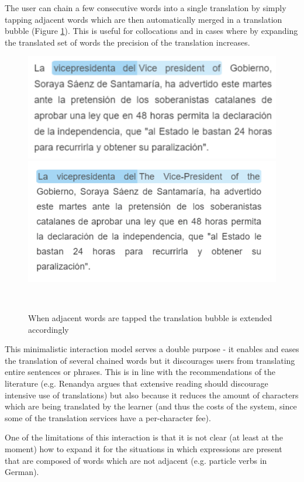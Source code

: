 The user can chain a few consecutive words into a single translation by simply tapping adjacent words which are then automatically merged in a translation bubble (Figure \ref{fig:translation_extension}). This is useful for collocations and in cases where by expanding the translated set of words the precision of the translation increases. 

    \begin{figure}[h!]
    \centering
      \includegraphics[width=0.75\columnwidth]{figures/translated_words1}
      \includegraphics[width=0.75\columnwidth]{figures/translated_words2}
      \caption{When adjacent words are tapped the translation bubble is extended accordingly}~\label{fig:translation_extension}
    \end{figure}

This minimalistic interaction model serves a double purpose - it enables and eases the translation of several chained words but it discourages users from translating entire sentences or phrases. This is in line with the recommendations of the literature (e.g. Renandya argues that extensive reading should discourage intensive use of translations\cite{renadya07-power}) but also because it reduces the amount of characters which are being translated by the learner (and thus the costs of the system, since some of the translation services have a per-character fee). 

One of the limitations of this interaction is that it is not clear (at least at the moment) how to expand it for the situations in which expressions are present that are composed of words which are not adjacent (e.g. particle verbs in German).


